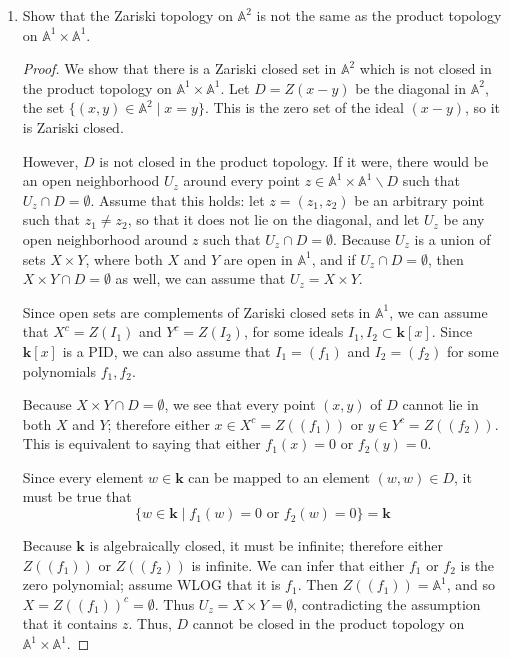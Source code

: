\documentclass[12pt]{article}
\theoremstyle{definition}
\newenvironment{problem}[2][Problem]{\begin{trivlist}
\item[\hskip \labelsep {\bfseries #1}\hskip \labelsep {\bfseries #2.}]}{\end{trivlist}}
\begin{document}
\begin{problem}{2}
\begin{enumerate}
\item Show that the Zariski topology on $\mathbb A^2$ is not the same as the product topology on $\mathbb A^1 \times \mathbb A^1$.
\begin{proof}
We show that there is a Zariski closed set in $\mathbb A^2$ which is not closed in the product topology on $\mathbb A^1 \times \mathbb A^1$. Let $D = Z(x - y)$ be the diagonal in $\mathbb A^2$, the set $\{(x,y) \in \mathbb A^2 \mid x = y\}$. This is the zero set of the ideal $(x-y)$, so it is Zariski closed.
\par However, $D$ is not closed in the product topology. If it were, there would be an open neighborhood $U_z$ around every point $z \in \mathbb A^1 \times \mathbb A^1 \backslash D$ such that $U_z \cap D = \emptyset$. Assume that this holds: let $z = (z_1, z_2)$ be an arbitrary point such that $z_1 \neq z_2$, so that it does not lie on the diagonal, and let $U_z$ be any open neighborhood around $z$ such that $U_z \cap D = \emptyset$. Because $U_z$ is a union of sets $X \times Y$, where both $X$ and $Y$ are open in $\mathbb A^1$, and if $U_z \cap D = \emptyset$, then $X \times Y \cap D = \emptyset$ as well, we can assume that $U_z = X \times Y$.
\par Since open sets are complements of Zariski closed sets in $\mathbb A^1$, we can assume that $X^c = Z(I_1)$ and $Y^c = Z(I_2)$, for some ideals $I_1, I_2 \subset \mathbf k[x]$. Since $ \mathbf{k}[x]$ is a PID, we can also assume that $I_1 = (f_1)$ and $I_2 = (f_2)$ for some polynomials $f_1, f_2$.
\par Because $X \times Y \cap D = \emptyset$, we see that every point $(x,y)$ of $D$ cannot lie in both $X$ and $Y$; therefore either $x \in X^c = Z((f_1))$ or $y \in Y^c = Z((f_2))$. This is equivalent to saying that either $f_1(x) = 0$ or $f_2(y) = 0$. 
\par Since every element $w \in \mathbf{k}$ can be mapped to an element $(w,w) \in D$, it must be true that \[\{w \in \mathbf{k} \mid f_1(w) = 0 \text{ or } f_2(w) = 0\} = \mathbf{k}\]
\par Because $\mathbf k$ is algebraically closed, it must be infinite; therefore either $Z((f_1))$ or $Z((f_2))$ is infinite. We can infer that either $f_1$ or $f_2$ is the zero polynomial; assume WLOG that it is $f_1$. Then $Z((f_1)) = \mathbb A^1$, and so $ X = Z((f_1))^c = \emptyset$. Thus $U_z = X \times Y = \emptyset$, contradicting the assumption that it contains $z$. Thus, $D$ cannot be closed in the product topology on $\mathbb A^1 \times \mathbb A^1$.

\end{proof}
\end{enumerate}
\end{problem}
\end{document}
